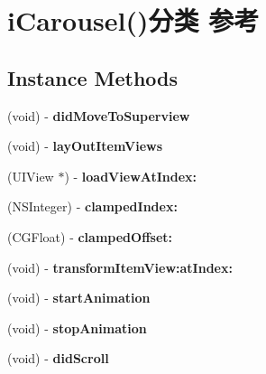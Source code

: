 \hypertarget{categoryi_carousel_07_08}{\section{i\-Carousel()分类 参考}
\label{categoryi_carousel_07_08}
}
\subsection*{Instance Methods}
\begin{DoxyCompactItemize}
\item 
\hypertarget{categoryi_carousel_07_08_a8760f79ad8ba3e0c6d70439349e73eb1}{(void) -\/ {\bfseries did\-Move\-To\-Superview}}\label{categoryi_carousel_07_08_a8760f79ad8ba3e0c6d70439349e73eb1}

\item 
\hypertarget{categoryi_carousel_07_08_ae818ea8a9ca3fcdc4f06ef828e9ec8c7}{(void) -\/ {\bfseries lay\-Out\-Item\-Views}}\label{categoryi_carousel_07_08_ae818ea8a9ca3fcdc4f06ef828e9ec8c7}

\item 
\hypertarget{categoryi_carousel_07_08_acd9eaf8b39a482025491bf04ae42c072}{(U\-I\-View $\ast$) -\/ {\bfseries load\-View\-At\-Index\-:}}\label{categoryi_carousel_07_08_acd9eaf8b39a482025491bf04ae42c072}

\item 
\hypertarget{categoryi_carousel_07_08_a8cb72d02f4563c2eb4050b8cf329a985}{(N\-S\-Integer) -\/ {\bfseries clamped\-Index\-:}}\label{categoryi_carousel_07_08_a8cb72d02f4563c2eb4050b8cf329a985}

\item 
\hypertarget{categoryi_carousel_07_08_af187706aaa359c742638cacdfe692605}{(C\-G\-Float) -\/ {\bfseries clamped\-Offset\-:}}\label{categoryi_carousel_07_08_af187706aaa359c742638cacdfe692605}

\item 
\hypertarget{categoryi_carousel_07_08_a10adc89ff70e1f4ea479803b91a4498d}{(void) -\/ {\bfseries transform\-Item\-View\-:at\-Index\-:}}\label{categoryi_carousel_07_08_a10adc89ff70e1f4ea479803b91a4498d}

\item 
\hypertarget{categoryi_carousel_07_08_ad9e53359f0c7767f2b8f6a6cdf952248}{(void) -\/ {\bfseries start\-Animation}}\label{categoryi_carousel_07_08_ad9e53359f0c7767f2b8f6a6cdf952248}

\item 
\hypertarget{categoryi_carousel_07_08_a84a10a5f0abd2de5ee2ea4acd15c6fab}{(void) -\/ {\bfseries stop\-Animation}}\label{categoryi_carousel_07_08_a84a10a5f0abd2de5ee2ea4acd15c6fab}

\item 
\hypertarget{categoryi_carousel_07_08_ae269992a6751754151c0dccc6063b80a}{(void) -\/ {\bfseries did\-Scroll}}\label{categoryi_carousel_07_08_ae269992a6751754151c0dccc6063b80a}

\end{DoxyCompactItemize}

